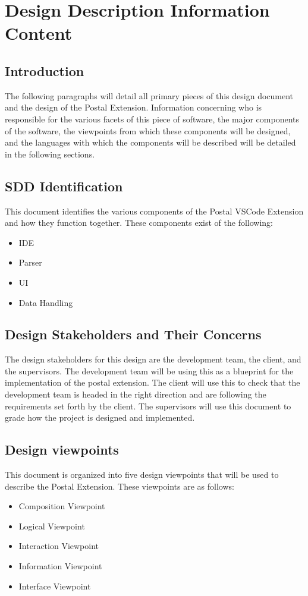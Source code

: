 \documentclass[letterpaper,10pt,titlepage,draftclsnofoot,onecolumn,onesided] {IEEEtran}
\begin{document}
\section{Design Description Information Content}

\subsection{Introduction}
The following paragraphs will detail all primary pieces of this design document and the design of the Postal Extension. 
Information concerning who is responsible for the various facets of this piece of software, the major components of the software, the viewpoints from which these components will be designed, and the languages with which the components will be described will be detailed in the following sections.

\subsection{SDD Identification}
This document identifies the various components of the Postal VSCode Extension and how they function together. These components exist of the following:
\begin{itemize}
	\item IDE
	\item Parser
	\item UI
	\item Data Handling
\end{itemize}

\subsection{Design Stakeholders and Their Concerns}
The design stakeholders for this design are the development team, the client, and the supervisors.
The development team will be using this as a blueprint for the implementation of the postal extension. 
The client will use this to check that the development team is headed in the right direction and are following the requirements set forth by the client.
The supervisors will use this document to grade how the project is designed and implemented.

\subsection{Design viewpoints}
This document is organized into five design viewpoints that will be used to describe the Postal Extension.
These viewpoints are as follows:
\begin {itemize}
	\item Composition Viewpoint
	\item Logical Viewpoint
	\item Interaction Viewpoint
	\item Information Viewpoint
	\item Interface Viewpoint
\end {itemize}
\end{document}
